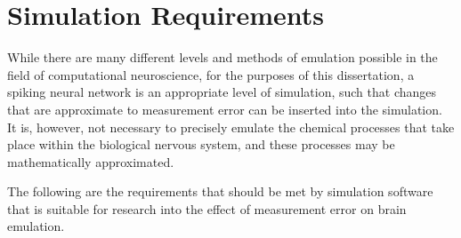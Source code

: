 \section{Simulation Requirements}


While there are many different levels and methods of emulation possible in the
field of computational neuroscience, for the purposes of this dissertation, a
spiking neural network is an appropriate level of simulation, such that changes
that are approximate to measurement error can be inserted into the simulation.
It is, however, not necessary to precisely emulate the chemical processes that
take place within the biological nervous system, and these processes may be
mathematically approximated.

The following are the requirements that should be met by simulation software
that is suitable for research into the effect of measurement error on brain
emulation.

